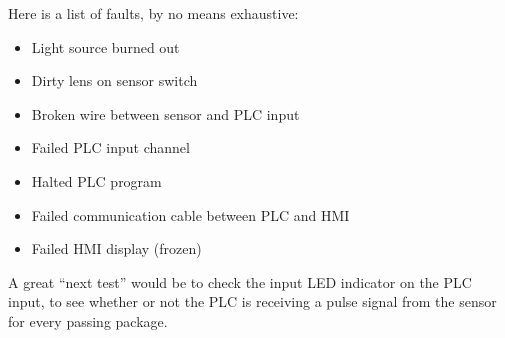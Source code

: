 





Here is a list of faults, by no means exhaustive:

\begin{itemize}
\item{} Light source burned out
\item{} Dirty lens on sensor switch
\item{} Broken wire between sensor and PLC input
\item{} Failed PLC input channel
\item{} Halted PLC program
\item{} Failed communication cable between PLC and HMI
\item{} Failed HMI display (frozen)
\end{itemize}

A great ``next test'' would be to check the input LED indicator on the PLC input, to see whether or not the PLC is receiving a pulse signal from the sensor for every passing package.




